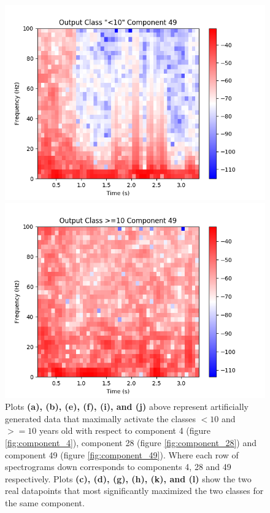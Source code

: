 \documentclass[fleqn,10pt]{wlscirep}
\begin{document}
\begin{figure}
\begin{minipage}{0.24\textwidth}
    \includegraphics[width=\linewidth]{max_act/real_0_49.png}
    \subcaption{}
  \end{minipage}
  \hspace*{\fill} 
  \begin{minipage}{0.24\textwidth}
    \includegraphics[width=\linewidth]{max_act/real_1_49.png}
    \subcaption{}
  \end{minipage}
  \caption{Plots \textbf{(a), (b), (e), (f), (i), and (j)} above represent artificially generated data that maximally activate the classes $<10$ and $>=10$ years old with respect to component 4 (figure \ref{fig:component_4}), component 28 (figure \ref{fig:component_28}) and component 49 (figure \ref{fig:component_49}). Where each row of spectrograms down corresponds to components 4, 28 and 49 respectively. Plots \textbf{(c), (d), (g), (h), (k), and (l)} show the two real datapoints that most significantly maximized the two classes for the same component.} \label{fig:max_spectrograms}
\end{figure}
\end{document}
